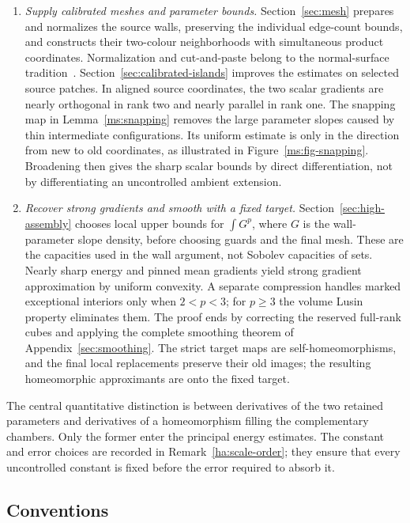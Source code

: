 \begin{enumerate}
\item \emph{Supply calibrated meshes and parameter bounds.}
Section~\ref{sec:mesh} prepares and normalizes the source walls,
preserving the individual edge-count bounds, and constructs their
two-colour neighborhoods with simultaneous product coordinates.
Normalization and cut-and-paste belong to the normal-surface
tradition~\cite{Haken1961}.  Section~\ref{sec:calibrated-islands}
improves the estimates on selected source patches.  In aligned source
coordinates, the two scalar gradients are nearly orthogonal in rank two and
nearly parallel in rank one.  The snapping map in
Lemma~\ref{ms:snapping} removes the large parameter slopes caused
by thin intermediate configurations.  Its uniform estimate is only
in the direction from new to old coordinates, as illustrated in
Figure~\ref{ms:fig-snapping}.  Broadening then gives the sharp
scalar bounds by direct differentiation, not by differentiating an
uncontrolled ambient extension.

\item \emph{Recover strong gradients and smooth with a fixed target.}
Section~\ref{sec:high-assembly} chooses local upper bounds for
$\int G^p$, where $G$ is the wall-parameter slope density, before
choosing guards and the final mesh.  These are the capacities used
in the wall argument, not Sobolev capacities of sets.  Nearly sharp
energy and pinned mean gradients yield strong gradient approximation
by uniform convexity.  A separate compression handles marked
exceptional interiors only when $2<p<3$; for $p\ge3$ the volume
Lusin property eliminates them.  The proof ends by correcting the
reserved full-rank cubes and applying the complete smoothing theorem
of Appendix~\ref{sec:smoothing}.  The strict target maps are
self-homeomorphisms, and the final local replacements preserve their
old images; the resulting homeomorphic approximants are onto the
fixed target.
\end{enumerate}

The central quantitative distinction is between derivatives of the
two retained parameters and derivatives of a homeomorphism filling
the complementary chambers.  Only the former enter the principal
energy estimates.  The constant and error choices are recorded in
Remark~\ref{ha:scale-order}; they ensure that every uncontrolled
constant is fixed before the error required to absorb it.

\subsection{Conventions}

